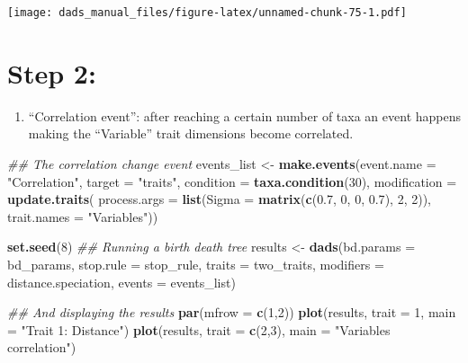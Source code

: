 \documentclass[]{book}
\newenvironment{Shaded}{\begin{snugshade}}{\end{snugshade}}
\newcommand{\CommentTok}[1]{\textcolor[rgb]{0.56,0.35,0.01}{\textit{#1}}}
\newcommand{\DataTypeTok}[1]{\textcolor[rgb]{0.13,0.29,0.53}{#1}}
\newcommand{\DecValTok}[1]{\textcolor[rgb]{0.00,0.00,0.81}{#1}}
\newcommand{\FloatTok}[1]{\textcolor[rgb]{0.00,0.00,0.81}{#1}}
\newcommand{\KeywordTok}[1]{\textcolor[rgb]{0.13,0.29,0.53}{\textbf{#1}}}
\newcommand{\NormalTok}[1]{#1}
\newcommand{\StringTok}[1]{\textcolor[rgb]{0.31,0.60,0.02}{#1}}
\providecommand{\tightlist}{%
  \setlength{\itemsep}{0pt}\setlength{\parskip}{0pt}}
\begin{document}
\texttt{[image: dads\_manual\_files/figure-latex/unnamed-chunk-75-1.pdf]}

\hypertarget{step-2}{%
\section{Step 2:}\label{step-2}}

\begin{enumerate}
\def\labelenumi{\arabic{enumi}.}
\setcounter{enumi}{1}
\tightlist
\item
  ``Correlation event'': after reaching a certain number of taxa an event happens making the ``Variable'' trait dimensions become correlated.
\end{enumerate}

\begin{Shaded}
\begin{Highlighting}[]
\CommentTok{## The correlation change event}
\NormalTok{events_list <-}\StringTok{ }\KeywordTok{make.events}\NormalTok{(}\DataTypeTok{event.name   =} \StringTok{"Correlation"}\NormalTok{,}
                           \DataTypeTok{target       =} \StringTok{"traits"}\NormalTok{,}
                           \DataTypeTok{condition    =} \KeywordTok{taxa.condition}\NormalTok{(}\DecValTok{30}\NormalTok{),}
                           \DataTypeTok{modification =} \KeywordTok{update.traits}\NormalTok{(}
                    \DataTypeTok{process.args =} \KeywordTok{list}\NormalTok{(}\DataTypeTok{Sigma =} \KeywordTok{matrix}\NormalTok{(}\KeywordTok{c}\NormalTok{(}\FloatTok{0.7}\NormalTok{, }\DecValTok{0}\NormalTok{, }\DecValTok{0}\NormalTok{, }\FloatTok{0.7}\NormalTok{), }\DecValTok{2}\NormalTok{, }\DecValTok{2}\NormalTok{)),}
                    \DataTypeTok{trait.names  =} \StringTok{"Variables"}\NormalTok{))}
\end{Highlighting}
\end{Shaded}

\begin{Shaded}
\begin{Highlighting}[]
\KeywordTok{set.seed}\NormalTok{(}\DecValTok{8}\NormalTok{)}
\CommentTok{## Running a birth death tree }
\NormalTok{results <-}\StringTok{ }\KeywordTok{dads}\NormalTok{(}\DataTypeTok{bd.params  =}\NormalTok{ bd_params,}
                \DataTypeTok{stop.rule  =}\NormalTok{ stop_rule,}
                \DataTypeTok{traits     =}\NormalTok{ two_traits,}
                \DataTypeTok{modifiers  =}\NormalTok{ distance.speciation,}
                \DataTypeTok{events     =}\NormalTok{ events_list)}

\CommentTok{## And displaying the results}
\KeywordTok{par}\NormalTok{(}\DataTypeTok{mfrow =} \KeywordTok{c}\NormalTok{(}\DecValTok{1}\NormalTok{,}\DecValTok{2}\NormalTok{))}
\KeywordTok{plot}\NormalTok{(results, }\DataTypeTok{trait =} \DecValTok{1}\NormalTok{, }\DataTypeTok{main =} \StringTok{"Trait 1: Distance"}\NormalTok{)}
\KeywordTok{plot}\NormalTok{(results, }\DataTypeTok{trait =} \KeywordTok{c}\NormalTok{(}\DecValTok{2}\NormalTok{,}\DecValTok{3}\NormalTok{), }\DataTypeTok{main =} \StringTok{"Variables correlation"}\NormalTok{)}
\end{Highlighting}
\end{Shaded}
\end{document}
